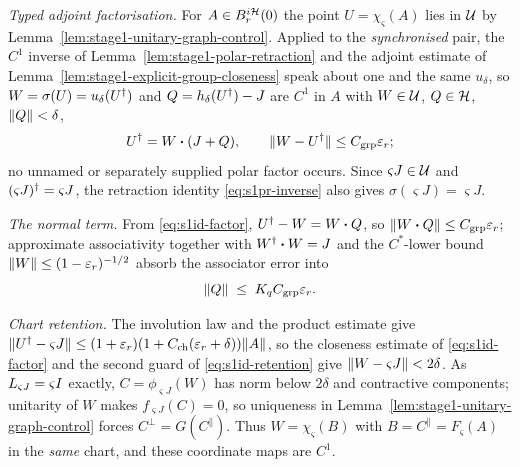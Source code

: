 \emph{Typed adjoint factorisation.} For $A\in B^{i\mathcal H}_{r}(0)$ the point
$U=\chi_{\varsigma}(A)$ lies in $\mathcal U$ by Lemma~\ref{lem:stage1-unitary-graph-control}.
Applied to the \emph{synchronised} pair, the $C^{1}$ inverse of
Lemma~\ref{lem:stage1-polar-retraction} and the adjoint estimate of
Lemma~\ref{lem:stage1-explicit-group-closeness} speak about one and the same $u_\delta$, so
$W=\sigma(U)=u_\delta(U^{\dagger})$ and $Q=h_\delta(U^{\dagger})-J$ are $C^{1}$ in $A$ with $W\in\mathcal U$,
$Q\in\mathcal H$, $\lVert Q\rVert<\delta$,
\begin{equation}\label{eq:s1id-factor}
  U^{\dagger}=W\mathbin{\bm{\cdot}}(J+Q),\qquad \lVert W-U^{\dagger}\rVert\le C_{\mathrm{grp}}\varepsilon_r ;
\end{equation}
no unnamed or separately supplied polar factor occurs. Since $\varsigma J\in\mathcal U$ and
$(\varsigma J)^{\dagger}=\varsigma J$, the retraction identity \eqref{eq:s1pr-inverse} also gives
$\sigma(\varsigma J)=\varsigma J$.

\emph{The normal term.} From \eqref{eq:s1id-factor}, $U^{\dagger}-W=W\mathbin{\bm{\cdot}} Q$, so
$\lVert W\mathbin{\bm{\cdot}} Q\rVert\le C_{\mathrm{grp}}\varepsilon_r$; approximate associativity together with
$W^{\dagger}\mathbin{\bm{\cdot}} W=J$ and the $C^*$-lower bound $\lVert W\rVert\le(1-\varepsilon_r)^{-1/2}$ absorb the associator
error into
\begin{equation}\label{eq:s1id-Q}
  \lVert Q\rVert\;\le\;K_qC_{\mathrm{grp}}\varepsilon_r .
\end{equation}

\emph{Chart retention.} The involution law and the product estimate give
$\lVert U^{\dagger}-\varsigma J\rVert\le(1+\varepsilon_r)(1+C_{\mathrm{ch}}(\varepsilon_r+\delta))\lVert A\rVert$, so the
closeness estimate of \eqref{eq:s1id-factor} and the second guard of
\eqref{eq:s1id-retention} give $\lVert W-\varsigma J\rVert<2\delta$. As
$L_{\varsigma J}=\varsigma I$ exactly, $C=\phi_{\varsigma J}(W)$ has norm below $2\delta$
and contractive components; unitarity of $W$ makes $f_{\varsigma J}(C)=0$, so uniqueness in
Lemma~\ref{lem:stage1-unitary-graph-control} forces $C^{\perp}=G(C^{\parallel})$. Thus
$W=\chi_{\varsigma}(B)$ with $B=C^{\parallel}=F_{\varsigma}(A)$ in the \emph{same} chart,
and these coordinate maps are $C^{1}$.

